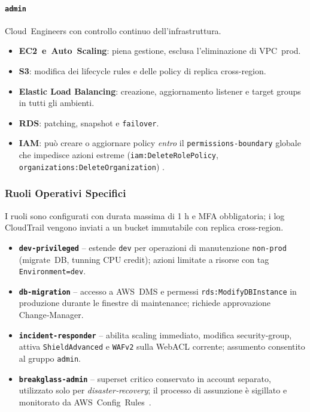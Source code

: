 \paragraph{\texttt{admin}}%
Cloud Engineers con controllo continuo dell’infrastruttura.  
\begin{itemize}
  \item \textbf{EC2 e Auto Scaling}: piena gestione, esclusa l’eliminazione di VPC prod.  
  \item \textbf{S3}: modifica dei lifecycle rules e delle policy di replica cross-region.
  
  \item \textbf{Elastic Load Balancing}: creazione, aggiornamento listener e target groups in tutti gli ambienti.
  
  \item \textbf{RDS}: patching, snapshot e \texttt{failover}.
  
  \item \textbf{IAM}: può creare o aggiornare policy \emph{entro} il \texttt{permissions-boundary} globale che impedisce azioni estreme (\texttt{iam:DeleteRolePolicy}, \texttt{organizations:DeleteOrganization}) \cite{AWSPermBoundaries}.
\end{itemize}

\subsubsection{Ruoli Operativi Specifici}
\label{subsubsec:ruoli_specifici}

I ruoli sono configurati con durata massima di 1 h e MFA obbligatoria;
i log CloudTrail vengono inviati a un bucket immutabile con
replica cross-region.

\begin{itemize}
  \item \textbf{\texttt{dev‑privileged}} – estende \texttt{dev} per operazioni
        di manutenzione \texttt{non‑prod} (migrate DB, tunning CPU credit);
        azioni limitate a risorse con tag \texttt{Environment=dev}.  
  \item \textbf{\texttt{db‑migration}} – accesso a AWS DMS e permessi
        \texttt{rds:ModifyDBInstance} in produzione durante le finestre di
        maintenance; richiede approvazione Change‑Manager.  
  \item \textbf{\texttt{incident‑responder}} – abilita scaling immediato,
        modifica security‑group, attiva \texttt{ShieldAdvanced} e
        \texttt{WAFv2} sulla WebACL corrente; assumento consentito al gruppo
        \texttt{admin}.  
  \item \textbf{\texttt{breakglass‑admin}} – superset critico conservato in
        account separato, utilizzato solo per \emph{disaster‑recovery}; il
        processo di assunzione è sigillato e monitorato da AWS Config Rules \cite{AWSSTS}.  
\end{itemize}

